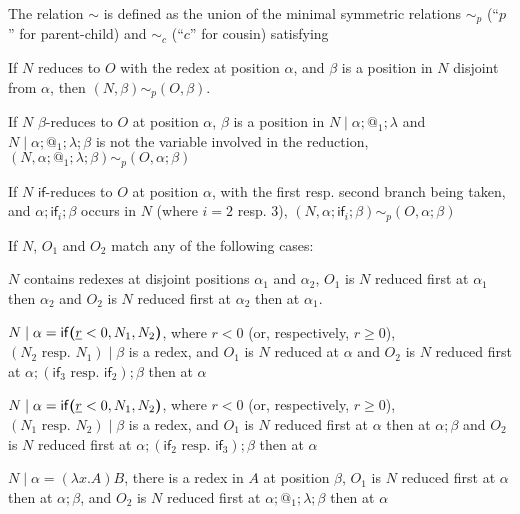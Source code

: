 \begin{definition} \label{defn:sim}
The relation $\sim$ is defined as the union of the minimal symmetric relations $\sim_p$ (``$p$'' for parent-child) and $\sim_c$ (``$c$'' for cousin) satisfying
\begin{asparaenum}[(i)]
    \item If $N$ reduces to $O$ with the redex at position $\alpha$, and $\beta$ is a position in $N$ disjoint from $\alpha$, then $(N,\beta) \sim_p (O,\beta)$.
    
    \item If $N$ $\beta$-reduces to $O$ at position $\alpha$, $\beta$ is a position in $N \mid \alpha;@_1;\lambda$ and $N \mid \alpha;@_1;\lambda;\beta$ is not the variable involved in the reduction, $(N,\alpha;@_1;\lambda;\beta) \sim_p (O, \alpha;\beta)$
    
    \item If $N$ $\textsf{if}$-reduces to $O$ at position $\alpha$, with the first resp. second branch being taken, and $\alpha;\textsf{if}_i;\beta$ occurs in $N$ (where $i = 2$ resp. $3$), $(N,\alpha;\textsf{if}_i;\beta) \sim_p (O,\alpha;\beta)$
    
    \item If $N$, $O_1$ and $O_2$ match any of the following cases:
    \begin{compactenum}
        \item $N$ contains redexes at disjoint positions $\alpha_1$ and $\alpha_2$, $O_1$ is $N$ reduced first at $\alpha_1$ then $\alpha_2$ and $O_2$ is $N$ reduced first at $\alpha_2$ then at $\alpha_1$.
        
        \item $N \mid \alpha = \mathsf{if}\boldsymbol{(}\underline r < 0, N_1, N_2\boldsymbol{)}$, where $r < 0$ (or, respectively, $r \geq 0$), $(N_2 \text{ resp. } N_1) \mid \beta$ is a redex, and $O_1$ is $N$ reduced at $\alpha$ and $O_2$ is $N$ reduced first at $\alpha;(\textsf{if}_3 \text{ resp. } \textsf{if}_2);\beta$ then at $\alpha$
        
        \item $N \mid \alpha = \mathsf{if}\boldsymbol{(}\underline r < 0, N_1, N_2\boldsymbol{)}$, where $r < 0$ (or, respectively, $r \geq 0$), $(N_1 \text{ resp. } N_2) \mid \beta$ is a redex, and $O_1$ is $N$ reduced first at $\alpha$ then at $\alpha;\beta$ and $O_2$ is $N$ reduced first at $\alpha;(\textsf{if}_2 \text{ resp. } \textsf{if}_3);\beta$ then at $\alpha$
        
        \item $N \mid \alpha = (\lambda x. A) B$, there is a redex in $A$ at position $\beta$, $O_1$ is $N$ reduced first at $\alpha$ then at $\alpha;\beta$, and $O_2$ is $N$ reduced first at $\alpha;@_1;\lambda;\beta$ then at $\alpha$
        

\end{compactenum}
\end{asparaenum}
\end{definition}

